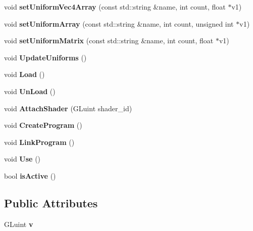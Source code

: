 \begin{DoxyCompactItemize}
\item 
void {\bfseries set\-Uniform\-Vec4\-Array} (const std\-::string \&name, int count, float $\ast$v1)\label{classSoundfieldViewer_1_1Shader_a679a0a70e8d86062787ffe9abf89ba85}

\item 
void {\bfseries set\-Uniform\-Array} (const std\-::string \&name, int count, unsigned int $\ast$v1)\label{classSoundfieldViewer_1_1Shader_a3c1e6ee63308e4553ed929206971c54c}

\item 
void {\bfseries set\-Uniform\-Matrix} (const std\-::string \&name, int count, float $\ast$v1)\label{classSoundfieldViewer_1_1Shader_aba53259a6984e9ad069e07607279fb23}

\item 
void {\bfseries Update\-Uniforms} ()\label{classSoundfieldViewer_1_1Shader_a0592f9fce60025f2df017bc88d4899a6}

\item 
void {\bfseries Load} ()\label{classSoundfieldViewer_1_1Shader_ad7227f11e41738fefcf9771e9bd15c83}

\item 
void {\bfseries Un\-Load} ()\label{classSoundfieldViewer_1_1Shader_a901670c18f4f347f1c41be1ba59187bd}

\item 
void {\bfseries Attach\-Shader} (G\-Luint shader\-\_\-id)\label{classSoundfieldViewer_1_1Shader_a573e260ab7f2d879d67b4a2fb45116b0}

\item 
void {\bfseries Create\-Program} ()\label{classSoundfieldViewer_1_1Shader_a47ecb907eddfb9ea8b006980292c9216}

\item 
void {\bfseries Link\-Program} ()\label{classSoundfieldViewer_1_1Shader_a55423bd7e718a64c2c86de471acea86d}

\item 
void {\bfseries Use} ()\label{classSoundfieldViewer_1_1Shader_a049e618589550d250c97d6b0f2d30051}

\item 
bool {\bfseries is\-Active} ()\label{classSoundfieldViewer_1_1Shader_a24d74d5c72ad1e24365e762aea878f39}

\end{DoxyCompactItemize}
\subsection*{Public Attributes}
\begin{DoxyCompactItemize}
\item 
G\-Luint {\bfseries v}\label{classSoundfieldViewer_1_1Shader_aa4320a4ba059b3b52583eedf5124db54}

\end{DoxyCompactItemize}
